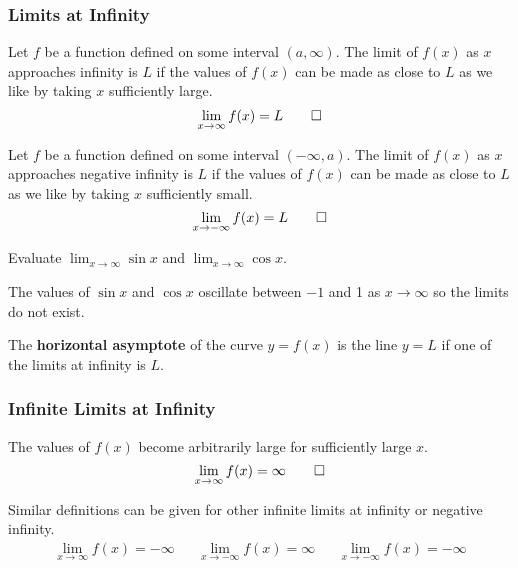 \subsubsection{Limits at Infinity}
\begin{definition}
    Let \(f\) be a function defined on some interval \((a,\infty)\).
    The limit of \(f(x)\) as \(x\) approaches infinity is \(L\) if the values
    of \(f(x)\) can be made as close to \(L\) as we like by taking \(x\)
    sufficiently large.
    \[\lim_{x\to\infty}f(x)=L\qedhere\]
\end{definition}
\begin{definition}
    Let \(f\) be a function defined on some interval \((-\infty,a)\).
    The limit of \(f(x)\) as \(x\) approaches negative infinity is \(L\) if
    the values of \(f(x)\) can be made as close to \(L\) as we like by taking \(x\)
    sufficiently small.
    \[\lim_{x\to -\infty}f(x)=L\qedhere\]
\end{definition}
\begin{problem}
    Evaluate \(\lim_{x\to\infty}\sin x\) and \(\lim_{x\to\infty}\cos x\).
\end{problem}
\begin{solution}
    The values of \(\sin x\) and \(\cos x\) oscillate between \(-1\) and 1 as
    \(x\to\infty\) so the limits do not exist.
\end{solution}
\begin{definition}
    The \textbf{horizontal asymptote} of the curve \(y=f(x)\) is the line \(y=L\)
    if one of the limits at infinity is \(L\).
\end{definition}

\subsubsection{Infinite Limits at Infinity}
\begin{definition}
    The values of \(f(x)\) become arbitrarily large for sufficiently large \(x\).
    \[\lim_{x\to\infty}f(x)=\infty\qedhere\]
\end{definition}
Similar definitions can be given for other infinite limits at infinity or
negative infinity.
\begin{align*}
    &\lim_{x\to\infty}f(x)=-\infty&&\lim_{x\to -\infty}f(x)=\infty&
    &\lim_{x\to -\infty}f(x)=-\infty&
\end{align*}

